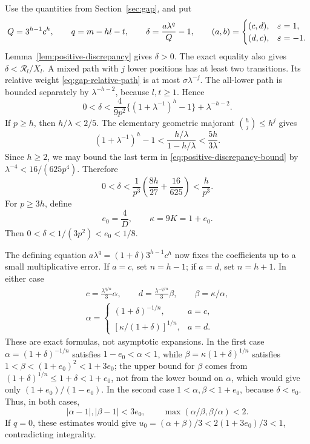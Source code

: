 Use the quantities from Section~\ref{sec:gap}, and put
$$
 Q=3^{h-1}c^h,\qquad q=m-hl-t,\qquad
 \delta=\frac{a\lambda^q}{Q}-1,
 \qquad (a,b)=\begin{cases}(c,d),&\varepsilon=1,\\(d,c),&\varepsilon=-1.
 \end{cases}
$$
Lemma~\ref{lem:positive-discrepancy} gives $\delta>0$. The exact
equality also gives $\delta<\mathcal R_l/X_l$. A mixed path with $j$
lower positions has at least two transitions. Its relative weight
\eqref{eq:gap-relative-path} is at most $\sigma\lambda^{-j}$.
The all-lower path is bounded separately by $\lambda^{-h-2}$, because
$l,t\geqslant1$. Hence
\begin{equation}\label{eq:positive-discrepancy-bound}
 0<\delta<\frac4{9p^2}\{(1+\lambda^{-1})^h-1\}
                  +\lambda^{-h-2}.
\end{equation}
If $p\geqslant h$, then $h/\lambda<2/5$. The elementary geometric
majorant $\binom hj\leqslant h^j$ gives
$$
 (1+\lambda^{-1})^h-1<\frac{h/\lambda}{1-h/\lambda}
 <\frac{5h}{3\lambda}.
$$
Since $h\geqslant2$, we may bound the last term in
\eqref{eq:positive-discrepancy-bound} by
$\lambda^{-4}<16/(625p^4)$. Therefore
\begin{equation}\label{eq:positive-small-delta}
 0<\delta<\frac1{p^3}\left(\frac{8h}{27}+\frac{16}{625}\right)
 <\frac h{p^3}.
\end{equation}
For $p\geqslant3h$, define
\begin{equation}\label{eq:positive-kappa}
 e_0=\frac4D,\qquad \kappa=9K=1+e_0.
\end{equation}
Then $0<\delta<1/(3p^2)<e_0<1/8$.

The defining equation $a\lambda^q=(1+\delta)3^{h-1}c^h$ now fixes
the coefficients up to a small multiplicative error. If $a=c$, set
$n=h-1$; if $a=d$, set $n=h+1$. In either case
\begin{equation}\label{eq:positive-coefficient-normalization}
 \begin{gathered}
 c=\frac{\lambda^{q/n}}3\alpha,\qquad
 d=\frac{\lambda^{-q/n}}3\beta,\qquad \beta=\kappa/\alpha,\\
 \alpha=
 \begin{cases}
 (1+\delta)^{-1/n},&a=c,\\
 [\kappa/(1+\delta)]^{1/n},&a=d.
 \end{cases}
 \end{gathered}
\end{equation}
These are exact formulas, not asymptotic expansions. In the first case
$\alpha=(1+\delta)^{-1/n}$ satisfies $1-e_0<\alpha<1$, while
$\beta=\kappa(1+\delta)^{1/n}$ satisfies $1<\beta<(1+e_0)^2<1+3e_0$;
the upper bound for $\beta$ comes from
$(1+\delta)^{1/n}\leqslant1+\delta<1+e_0$, not from the lower bound on
$\alpha$, which would give only $(1+e_0)/(1-e_0)$.
In the second case $1<\alpha,\beta<1+e_0$, because $\delta<e_0$.
Thus, in both cases,
\begin{equation}\label{eq:positive-coefficient-errors}
 |\alpha-1|,|\beta-1|<3e_0,
 \qquad \max(\alpha/\beta,\beta/\alpha)<2.
\end{equation}
If $q=0$, these estimates would give
$u_0=(\alpha+\beta)/3<2(1+3e_0)/3<1$, contradicting integrality.


